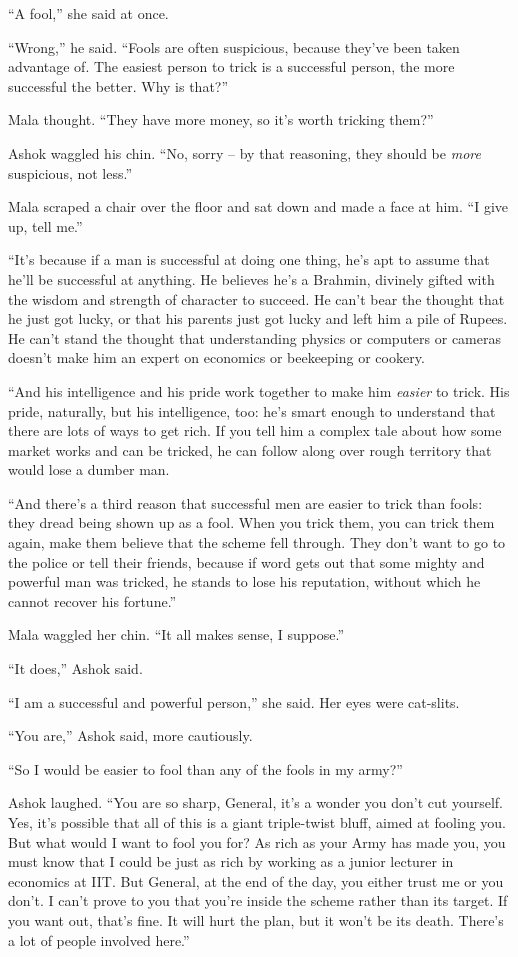 ``A fool,'' she said at once.

``Wrong,'' he said. ``Fools are often suspicious, because they've been
taken advantage of. The easiest person to trick is a successful
person, the more successful the better. Why is that?''

Mala thought. ``They have more money, so it's worth tricking them?''

Ashok waggled his chin. ``No, sorry -- by that reasoning, they
should be \emph{more} suspicious, not less.''

Mala scraped a chair over the floor and sat down and made a face at
him. ``I give up, tell me.''

``It's because if a man is successful at doing one thing, he's apt
to assume that he'll be successful at anything. He believes he's a
Brahmin, divinely gifted with the wisdom and strength of character
to succeed. He can't bear the thought that he just got lucky, or
that his parents just got lucky and left him a pile of Rupees. He
can't stand the thought that understanding physics or computers or
cameras doesn't make him an expert on economics or beekeeping or
cookery.

``And his intelligence and his pride work together to make him
\emph{easier} to trick. His pride, naturally, but his intelligence,
too: he's smart enough to understand that there are lots of ways to
get rich. If you tell him a complex tale about how some market
works and can be tricked, he can follow along over rough territory
that would lose a dumber man.

``And there's a third reason that successful men are easier to trick
than fools: they dread being shown up as a fool. When you trick
them, you can trick them again, make them believe that the scheme
fell through. They don't want to go to the police or tell their
friends, because if word gets out that some mighty and powerful man
was tricked, he stands to lose his reputation, without which he
cannot recover his fortune.''

Mala waggled her chin. ``It all makes sense, I suppose.''

``It does,'' Ashok said.

``I am a successful and powerful person,'' she said. Her eyes were
cat-slits.

``You are,'' Ashok said, more cautiously.

``So I would be easier to fool than any of the fools in my army?''

Ashok laughed. ``You are so sharp, General, it's a wonder you don't
cut yourself. Yes, it's possible that all of this is a giant
triple-twist bluff, aimed at fooling you. But what would I want to
fool you for? As rich as your Army has made you, you must know that
I could be just as rich by working as a junior lecturer in
economics at IIT. But General, at the end of the day, you either
trust me or you don't. I can't prove to you that you're inside the
scheme rather than its target. If you want out, that's fine. It
will hurt the plan, but it won't be its death. There's a lot of
people involved here.''

